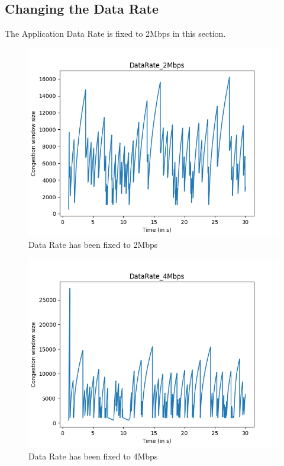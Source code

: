\documentclass{article}
\begin{document}
\subsection{Changing the Data Rate}
The Application Data Rate is fixed to 2Mbps in this section.

\begin{figure}[H]
    \centering
    \includegraphics[scale = 0.8]{Q2/outputs/plots/DataRate_2Mbps.png}
    \caption{Data Rate has been fixed to 2Mbps}
\end{figure}

\begin{figure}[H]
    \centering
    \includegraphics[scale = 0.8]{Q2/outputs/plots/DataRate_4Mbps.png}
    \caption{Data Rate has been fixed to 4Mbps}
\end{figure}
\end{document}
